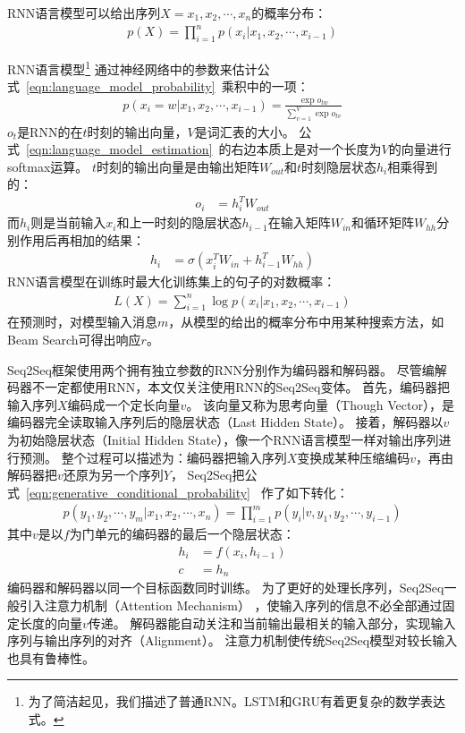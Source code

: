 RNN语言模型可以给出序列$X=x_1, x_2, \cdots, x_n$的概率分布：
\begin{align}
    p(X) = \prod_{i=1}^{n} p(x_i|x_1, x_2, \cdots, x_{i-1})
    \label{eqn:language_model_probability}
\end{align}

RNN语言模型\footnote{为了简洁起见，我们描述了普通RNN。LSTM和GRU有着更复杂的数学表达式。}
通过神经网络中的参数来估计公式~\ref{eqn:language_model_probability}~乘积中的一项：
\begin{align}
    p(x_i = w|x_1, x_2, \cdots, x_{i-1}) = \frac{\exp{o_{tw}}}{\sum_{v=1}^V \exp{o_{tv}}}
    \label{eqn:language_model_estimation}
\end{align}
$o_t$是RNN的在$t$时刻的输出向量，$V$是词汇表的大小。
公式~\ref{eqn:language_model_estimation}~的右边本质上是对一个长度为$V$的向量进行softmax运算。
$t$时刻的输出向量是由输出矩阵$W_{out}$和$t$时刻隐层状态$h_i$相乘得到的：
\begin{align}
    o_i &= h_i^T W_{out}
\end{align}
而$h_i$则是当前输入$x_i$和上一时刻的隐层状态$h_{i-1}$在输入矩阵$W_{in}$和循环矩阵$W_{hh}$分别作用后再相加的结果：
\begin{align}
    h_i &= \sigma \left( x_i^T W_{in} + h_{i-1}^T W_{hh} \right)
\end{align}
RNN语言模型在训练时最大化训练集上的句子的对数概率：
\begin{align}
    \mathit{L(X)} = \sum_{i=1}^n \log p(x_i|x_1, x_2, \cdots, x_{i-1})
\end{align}
在预测时，对模型输入消息$m$，从模型的给出的概率分布中用某种搜索方法，如Beam Search可得出响应$r$。

Seq2Seq框架使用两个拥有独立参数的RNN分别作为编码器和解码器。
尽管编解码器不一定都使用RNN，本文仅关注使用RNN的Seq2Seq变体。
首先，编码器把输入序列$X$编码成一个定长向量$v$。
该向量又称为思考向量（Though Vector），是编码器完全读取输入序列后的隐层状态（Last Hidden State）。
接着，解码器以$v$为初始隐层状态（Initial Hidden State），像一个RNN语言模型一样对输出序列进行预测。
整个过程可以描述为：编码器把输入序列$X$变换成某种压缩编码$v$，再由解码器把$v$还原为另一个序列$Y$，
Seq2Seq把公式~\ref{eqn:generative_conditional_probability}~
作了如下转化：
\begin{align}
    p(y_1, y_2, \cdots, y_m|x_1, x_2, \cdots, x_n) = \prod_{i=1}^m p(y_i|v, y_1, y_2, \cdots, y_{i-1})
\end{align}
其中$v$是以$f$为门单元的编码器的最后一个隐层状态：
\begin{align}
    h_i &= f(x_i ,h_{i-1}) \\
    c &= h_n
\end{align}
编码器和解码器以同一个目标函数同时训练。
为了更好的处理长序列，Seq2Seq一般引入注意力机制（Attention Mechanism）
，使输入序列的信息不必全部通过固定长度的向量$v$传递。
解码器能自动关注和当前输出最相关的输入部分，实现输入序列与输出序列的对齐（Alignment）。
注意力机制使传统Seq2Seq模型对较长输入也具有鲁棒性。

